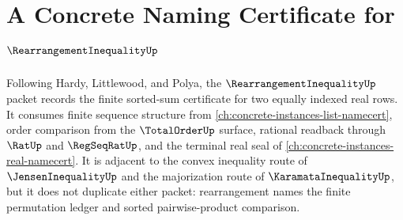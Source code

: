 \chapter{A Concrete Naming Certificate for $\RearrangementInequalityUp$}
\label{ch:concrete-instances-rearrangement-inequality-namecert}

Following Hardy, Littlewood, and Polya, the $\RearrangementInequalityUp$ packet records the finite sorted-sum certificate for two equally indexed real rows. It consumes finite sequence structure from \autoref{ch:concrete-instances-list-namecert}, order comparison from the $\TotalOrderUp$ surface, rational readback through $\RatUp$ and $\RegSeqRatUp$, and the terminal real seal of \autoref{ch:concrete-instances-real-namecert}. It is adjacent to the convex inequality route of $\JensenInequalityUp$ and the majorization route of $\KaramataInequalityUp$, but it does not duplicate either packet: rearrangement names the finite permutation ledger and sorted pairwise-product comparison.

